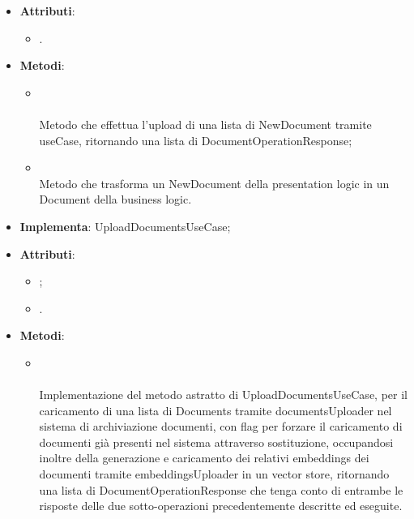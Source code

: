 \documentclass[10pt, a4paper]{article}
\begin{document}
\label{UploadDocumentsControllerDettaglio}
\begin{itemize}
    \item \textbf{Attributi}:
    \begin{itemize}
        \item {}.
    \end{itemize}
    \item \textbf{Metodi}:
    \begin{itemize}
        \item {}\\ \\
        Metodo che effettua l'upload di una lista di NewDocument tramite useCase, ritornando una lista di DocumentOperationResponse;
        \item {}\\
        Metodo che trasforma un NewDocument della presentation logic in un Document della business logic.
    \end{itemize}
\end{itemize}



\label{UploadDocumentsServiceDettaglio}
\begin{itemize}
    \item \textbf{Implementa}: UploadDocumentsUseCase;
    \item \textbf{Attributi}:
    \begin{itemize}
        \item {};
        \item {}.  
    \end{itemize}
    \item \textbf{Metodi}:
    \begin{itemize}
        \item {}\\ \\
        Implementazione del metodo astratto di UploadDocumentsUseCase, per il caricamento di una lista di Documents tramite documentsUploader nel sistema di archiviazione documenti, con flag per forzare il caricamento di documenti già presenti nel sistema attraverso sostituzione, occupandosi inoltre della generazione e caricamento dei relativi embeddings dei documenti tramite embeddingsUploader in un vector store, ritornando una lista di DocumentOperationResponse che tenga conto di entrambe le risposte delle due sotto-operazioni precedentemente descritte ed eseguite.
    \end{itemize}
\end{itemize}
\end{document}

